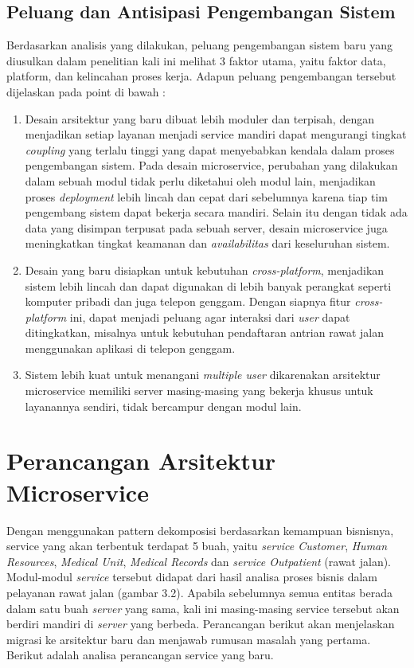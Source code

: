 \subsection{Peluang dan Antisipasi Pengembangan Sistem}
Berdasarkan analisis yang dilakukan, peluang pengembangan sistem baru yang diusulkan dalam penelitian kali ini melihat 3 faktor utama, yaitu faktor data, platform, dan kelincahan proses kerja. Adapun peluang pengembangan tersebut dijelaskan pada point di bawah :

\begin{enumerate}[leftmargin=*]
	\item Desain arsitektur yang baru dibuat lebih moduler dan terpisah, dengan menjadikan setiap layanan menjadi service mandiri dapat mengurangi tingkat \textit{coupling} yang terlalu tinggi yang dapat menyebabkan kendala dalam proses pengembangan sistem. Pada desain microservice, perubahan yang dilakukan dalam sebuah modul tidak perlu diketahui oleh modul lain, menjadikan proses \textit{deployment} lebih lincah dan cepat dari sebelumnya karena tiap tim pengembang sistem dapat bekerja secara mandiri. Selain itu dengan tidak ada data yang disimpan terpusat pada sebuah server, desain microservice juga meningkatkan tingkat keamanan dan \textit{availabilitas} dari keseluruhan sistem.
	\item Desain yang baru disiapkan untuk kebutuhan \textit{cross-platform}, menjadikan sistem lebih lincah dan dapat digunakan di lebih banyak perangkat seperti komputer pribadi dan juga telepon genggam. Dengan siapnya fitur \textit{cross-platform} ini, dapat menjadi peluang agar interaksi dari \textit{user} dapat ditingkatkan, misalnya untuk kebutuhan pendaftaran antrian rawat jalan menggunakan aplikasi di telepon genggam.
	\item Sistem lebih kuat untuk menangani \textit{multiple user} dikarenakan arsitektur microservice memiliki server masing-masing yang bekerja khusus untuk layanannya sendiri, tidak bercampur dengan modul lain.
\end{enumerate}

\section{Perancangan Arsitektur Microservice}
Dengan menggunakan pattern dekomposisi berdasarkan kemampuan bisnisnya, service yang akan terbentuk terdapat 5 buah, yaitu \textit{service Customer}, \textit{Human Resources}, \textit{Medical Unit}, \textit{Medical Records} dan \textit{service Outpatient} (rawat jalan). Modul-modul \textit{service} tersebut didapat dari hasil analisa proses bisnis dalam pelayanan rawat jalan (gambar 3.2). Apabila sebelumnya semua entitas berada dalam satu buah \textit{server} yang sama, kali ini masing-masing service tersebut akan berdiri mandiri di \textit{server} yang berbeda. Perancangan berikut akan menjelaskan migrasi ke arsitektur baru dan menjawab rumusan masalah yang pertama. Berikut adalah analisa perancangan service yang baru.
